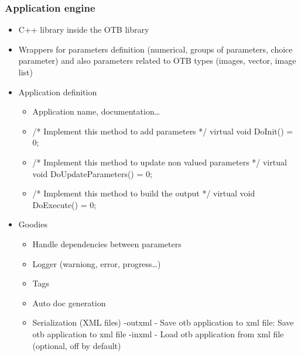 \documentclass[8pt]{beamer}
\begin{document}
\begin{frame}
\frametitle{Application engine}
\begin{itemize}
\item C++ library inside the OTB library
\item Wrappers for parameters definition (numerical, groups of parameters,
choice parameter) and also
parameters related to OTB types (images, vector, image list)
\item Application definition  
\begin{itemize}
\item Application name, documentation\ldots
\item   /* Implement this method to add parameters */ virtual void DoInit() = 0;
\item /* Implement this method to update non valued parameters */ virtual void DoUpdateParameters() = 0;
\item /* Implement this method to build the output */ virtual void DoExecute() = 0;
\end{itemize}
\item Goodies
\begin{itemize}
\item Handle dependencies between parameters
\item Logger (warniong, error, progress\ldots)
\item Tags
\item Auto doc generation
\item Serialization (XML files) 
-outxml - Save otb application to xml file: Save otb application to xml file
-inxml  - Load otb application from xml file  (optional, off by default)
\end{itemize}
\end{itemize}
\end{frame}
\end{document}
